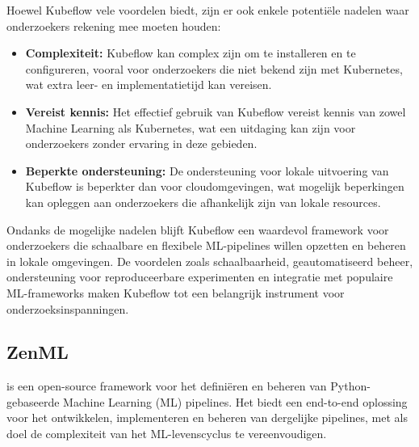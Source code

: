 Hoewel Kubeflow vele voordelen biedt, zijn er ook enkele potentiële nadelen waar onderzoekers rekening mee moeten houden:
\begin{itemize}
    \item \textbf{Complexiteit:} Kubeflow kan complex zijn om te installeren en te configureren, vooral voor onderzoekers die niet bekend zijn met Kubernetes, wat extra leer- en implementatietijd kan vereisen.
    \item \textbf{Vereist kennis:} Het effectief gebruik van Kubeflow vereist kennis van zowel Machine Learning als Kubernetes, wat een uitdaging kan zijn voor onderzoekers zonder ervaring in deze gebieden.
    \item \textbf{Beperkte ondersteuning:} De ondersteuning voor lokale uitvoering van Kubeflow is beperkter dan voor cloudomgevingen, wat mogelijk beperkingen kan opleggen aan onderzoekers die afhankelijk zijn van lokale resources.
\end{itemize}

Ondanks de mogelijke nadelen blijft Kubeflow een waardevol framework voor onderzoekers die schaalbare en flexibele ML-pipelines willen opzetten en beheren in lokale omgevingen. De voordelen zoals schaalbaarheid, geautomatiseerd beheer, ondersteuning voor reproduceerbare experimenten en integratie met populaire ML-frameworks maken Kubeflow tot een belangrijk instrument voor onderzoeksinspanningen.

\subsection{ZenML}

\textcite{ZenML2024} is een open-source framework voor het definiëren en beheren van Python-gebaseerde Machine Learning (ML) pipelines. Het biedt een end-to-end oplossing voor het ontwikkelen, implementeren en beheren van dergelijke pipelines, met als doel de complexiteit van het ML-levenscyclus te vereenvoudigen.


